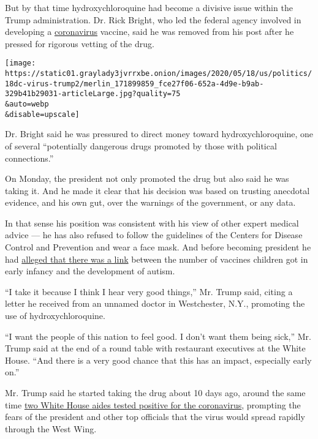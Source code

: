 But by that time hydroxychloroquine had become a divisive issue within
the Trump administration. Dr. Rick Bright, who led the federal agency
involved in developing a
\href{https://www.nytimes3xbfgragh.onion/2020/04/30/health/coronavirus-antiviral-drugs.html}{coronavirus}
vaccine, said he was removed from his post after he pressed for rigorous
vetting of the drug.

\texttt{[image: https://static01.graylady3jvrrxbe.onion/images/2020/05/18/us/politics/18dc-virus-trump2/merlin\_171899859\_fce27f06-652a-4d9e-b9ab-329b41b29031-articleLarge.jpg?quality=75\\\&auto=webp\\\&disable=upscale]}

Dr. Bright said he was pressured to direct money toward
hydroxychloroquine, one of several ``potentially dangerous drugs
promoted by those with political connections.''

On Monday, the president not only promoted the drug but also said he was
taking it. And he made it clear that his decision was based on trusting
anecdotal evidence, and his own gut, over the warnings of the
government, or any data.

In that sense his position was consistent with his view of other expert
medical advice --- he has also refused to follow the guidelines of the
Centers for Disease Control and Prevention and wear a face mask. And
before becoming president he had
\href{https://www.statnews.com/2019/04/26/trump-vaccinations-measles/}{alleged
that there was a link} between the number of vaccines children got in
early infancy and the development of autism.

``I take it because I think I hear very good things,'' Mr. Trump said,
citing a letter he received from an unnamed doctor in Westchester, N.Y.,
promoting the use of hydroxychloroquine.

``I want the people of this nation to feel good. I don't want them being
sick,'' Mr. Trump said at the end of a round table with restaurant
executives at the White House. ``And there is a very good chance that
this has an impact, especially early on.''

Mr. Trump said he started taking the drug about 10 days ago, around the
same time
\href{https://www.nytimes3xbfgragh.onion/2020/05/10/us/politics/white-house-coronavirus-trump.html}{two
White House aides tested positive for the coronavirus}, prompting the
fears of the president and other top officials that the virus would
spread rapidly through the West Wing.

\href{https://www.nytimes3xbfgragh.onion/news-event/coronavirus?action=click\&pgtype=Article\&state=default\&region=MAIN_CONTENT_3\&context=storylines_faq}{}

